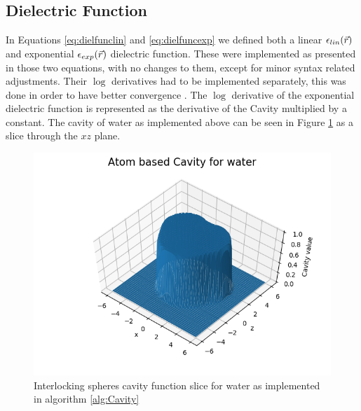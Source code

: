 \documentclass[..Thesis.tex]{subfiles}
\begin{document}
\subsection{Dielectric Function}
In Equations \ref{eq:dielfunclin} and \ref{eq:dielfuncexp} we defined both a
linear $\epsilon_{lin}(\vec{r})$ and exponential $\epsilon_{exp}(\vec{r})$ dielectric function. These were implemented as presented
in those two equations, with no changes to them, except for minor syntax related
adjustments. Their $\log$ derivatives had to be implemented separately,
this was done in order to have better convergence \cite{FossoTande:2013ka}. The
$\log$ derivative of the exponential dielectric function is represented as the
derivative of the Cavity multiplied by a constant. The cavity of water as implemented
above can be seen in Figure \ref{fig:watcav} as a slice through the $xz$ plane.

\begin{figure}[ht]
  \includegraphics[width=\linewidth]{img/Figure_1-1.png}
  \caption[Interlocking spheres cavity for water]{Interlocking spheres cavity function slice for water as implemented in algorithm \ref{alg:Cavity}}
  \label{fig:watcav}
\end{figure}
\clearpage
\end{document}
